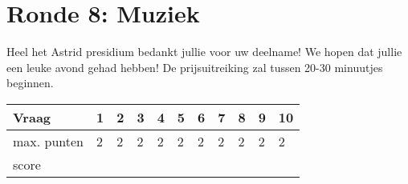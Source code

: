 
\section{Ronde 8: Muziek}
\begin{questions}

\question[2] \enspace\hrulefill
\vspace{5mm}
\question[2] \enspace\hrulefill
\vspace{5mm}
\question[2] \enspace\hrulefill
\vspace{5mm}
\question[2] \enspace\hrulefill
\vspace{5mm}
\question[2] \enspace\hrulefill
\vspace{5mm}
\question[2] \enspace\hrulefill
\vspace{5mm}
\question[2] \enspace\hrulefill
\vspace{5mm}
\question[2] \enspace\hrulefill
\vspace{5mm}
\question[2] \enspace\hrulefill
\vspace{5mm}
\question[2] \enspace\hrulefill

\end{questions}
\vspace{5em}
Heel het Astrid presidium bedankt jullie voor uw deelname! We hopen dat jullie een leuke avond gehad hebben! De prijsuitreiking zal tussen 20-30 minuutjes beginnen. 
\begin{table}[!b]
\centering
\begin{tabular}{|l|l|l|l|l|l|l|l|l|l|l|}
\hline
Vraag       & 1 & 2 & 3 & 4 & 5 & 6 & 7 & 8 & 9 & 10 \\ \hline
max. punten & 2 & 2 & 2 & 2 & 2 & 2 & 2 & 2 & 2 & 2  \\ \hline
score       &   &   &   &   &   &   &   &   &   &    \\ \hline
\end{tabular}
\end{table}
\newpage
